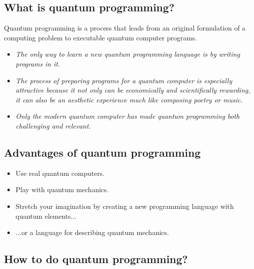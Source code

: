\documentclass[a4paper,11pt]{article}
\begin{document}
\subsection{What is quantum programming?}
Quantum programming is a process that leads from an original formulation of a 
computing problem to executable quantum computer programs.

\begin{itemize}

\item \emph{The only way to learn a new quantum programming language is 
    by writing programs in it.}

\item \emph{The process of preparing programs for a quantum computer is 
    especially attractive because it not only can be economically and 
    scientifically rewarding, it can also be an aesthetic experience much like 
    composing poetry or music.}

\item \emph{Only the modern quantum computer has made quantum 
    programming both challenging and relevant.}

\end{itemize}

\subsection{Advantages of quantum programming}


\begin{itemize}
    \item Use real quantum computers. 
    \item Play with quantum mechanics.
    \item Stretch your imagination by creating a new programming 
    language with quantum elements...
    \item ...or a language for describing quantum mechanics.
\end{itemize}

\subsection{How to do quantum programming?}
\end{document}
